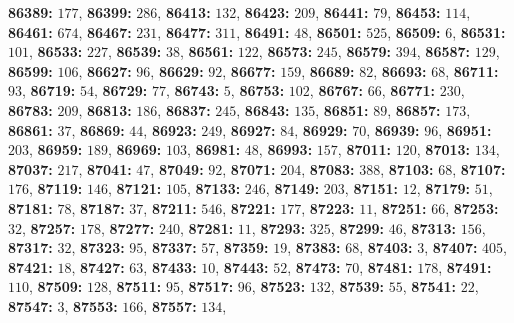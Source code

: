 \textsf{\bfseries 86389:} $177$, \textsf{\bfseries 86399:} $286$, \textsf{\bfseries 86413:} $132$, \textsf{\bfseries 86423:} $209$, \textsf{\bfseries 86441:} $79$, \textsf{\bfseries 86453:} $114$, \textsf{\bfseries 86461:} $674$, \textsf{\bfseries 86467:} $231$, \textsf{\bfseries 86477:} $311$, \textsf{\bfseries 86491:} $48$, \textsf{\bfseries 86501:} $525$, \textsf{\bfseries 86509:} $6$, \textsf{\bfseries 86531:} $101$, \textsf{\bfseries 86533:} $227$, \textsf{\bfseries 86539:} $38$, \textsf{\bfseries 86561:} $122$, \textsf{\bfseries 86573:} $245$, \textsf{\bfseries 86579:} $394$, \textsf{\bfseries 86587:} $129$, \textsf{\bfseries 86599:} $106$, \textsf{\bfseries 86627:} $96$, \textsf{\bfseries 86629:} $92$, \textsf{\bfseries 86677:} $159$, \textsf{\bfseries 86689:} $82$, \textsf{\bfseries 86693:} $68$, \textsf{\bfseries 86711:} $93$, \textsf{\bfseries 86719:} $54$, \textsf{\bfseries 86729:} $77$, \textsf{\bfseries 86743:} $5$, \textsf{\bfseries 86753:} $102$, \textsf{\bfseries 86767:} $66$, \textsf{\bfseries 86771:} $230$, \textsf{\bfseries 86783:} $209$, \textsf{\bfseries 86813:} $186$, \textsf{\bfseries 86837:} $245$, \textsf{\bfseries 86843:} $135$, \textsf{\bfseries 86851:} $89$, \textsf{\bfseries 86857:} $173$, \textsf{\bfseries 86861:} $37$, \textsf{\bfseries 86869:} $44$, \textsf{\bfseries 86923:} $249$, \textsf{\bfseries 86927:} $84$, \textsf{\bfseries 86929:} $70$, \textsf{\bfseries 86939:} $96$, \textsf{\bfseries 86951:} $203$, \textsf{\bfseries 86959:} $189$, \textsf{\bfseries 86969:} $103$, \textsf{\bfseries 86981:} $48$, \textsf{\bfseries 86993:} $157$, \textsf{\bfseries 87011:} $120$, \textsf{\bfseries 87013:} $134$, \textsf{\bfseries 87037:} $217$, \textsf{\bfseries 87041:} $47$, \textsf{\bfseries 87049:} $92$, \textsf{\bfseries 87071:} $204$, \textsf{\bfseries 87083:} $388$, \textsf{\bfseries 87103:} $68$, \textsf{\bfseries 87107:} $176$, \textsf{\bfseries 87119:} $146$, \textsf{\bfseries 87121:} $105$, \textsf{\bfseries 87133:} $246$, \textsf{\bfseries 87149:} $203$, \textsf{\bfseries 87151:} $12$, \textsf{\bfseries 87179:} $51$, \textsf{\bfseries 87181:} $78$, \textsf{\bfseries 87187:} $37$, \textsf{\bfseries 87211:} $546$, \textsf{\bfseries 87221:} $177$, \textsf{\bfseries 87223:} $11$, \textsf{\bfseries 87251:} $66$, \textsf{\bfseries 87253:} $32$, \textsf{\bfseries 87257:} $178$, \textsf{\bfseries 87277:} $240$, \textsf{\bfseries 87281:} $11$, \textsf{\bfseries 87293:} $325$, \textsf{\bfseries 87299:} $46$, \textsf{\bfseries 87313:} $156$, \textsf{\bfseries 87317:} $32$, \textsf{\bfseries 87323:} $95$, \textsf{\bfseries 87337:} $57$, \textsf{\bfseries 87359:} $19$, \textsf{\bfseries 87383:} $68$, \textsf{\bfseries 87403:} $3$, \textsf{\bfseries 87407:} $405$, \textsf{\bfseries 87421:} $18$, \textsf{\bfseries 87427:} $63$, \textsf{\bfseries 87433:} $10$, \textsf{\bfseries 87443:} $52$, \textsf{\bfseries 87473:} $70$, \textsf{\bfseries 87481:} $178$, \textsf{\bfseries 87491:} $110$, \textsf{\bfseries 87509:} $128$, \textsf{\bfseries 87511:} $95$, \textsf{\bfseries 87517:} $96$, \textsf{\bfseries 87523:} $132$, \textsf{\bfseries 87539:} $55$, \textsf{\bfseries 87541:} $22$, \textsf{\bfseries 87547:} $3$, \textsf{\bfseries 87553:} $166$, \textsf{\bfseries 87557:} $134$, 
